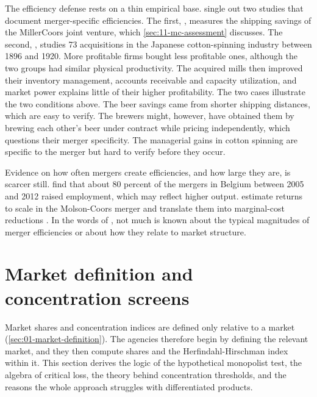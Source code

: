 The efficiency defense rests on a thin empirical base. \citet[pp.~219--221]{AskerNocke2021} single out two studies
that document merger-specific efficiencies. The first, \citet{AshenfelterHoskenWeinberg2015}, measures the
shipping savings of the MillerCoors joint venture, which \cref{sec:11-mc-assessment} discusses. The second,
\citet{BraguinskyEtAl2015}, studies 73 acquisitions in the Japanese cotton-spinning industry between 1896 and 1920.
More profitable firms bought less profitable ones, although the two groups had similar physical productivity. The
acquired mills then improved their inventory management, accounts receivable and capacity utilization, and market
power explains little of their higher profitability. The two cases illustrate the two conditions above. The beer
savings came from shorter shipping distances, which are easy to verify. The brewers might, however, have obtained
them by brewing each other's beer under contract while pricing independently, which questions their merger
specificity. The managerial gains in cotton spinning are specific to the merger but hard to verify before they
occur.

Evidence on how often mergers create efficiencies, and how large they are, is scarcer still.
\citet{GeurtsVanBiesebroeck2019} find that about 80 percent of the mergers in Belgium between 2005 and 2012 raised
employment, which may reflect higher output. \citet{GriecoPinkseSlade2018} estimate returns to scale in the
Molson-Coors merger and translate them into marginal-cost reductions \citep[pp.~221--222]{AskerNocke2021}. In the
words of \citet[p.~261]{AskerNocke2021}, not much is known about the typical magnitudes of merger efficiencies or
about how they relate to market structure.

\section{Market definition and concentration screens}\label{sec:11-marketdef}

Market shares and concentration indices are defined only relative to a market (\cref{sec:01-market-definition}).
The agencies therefore begin by defining the relevant market, and they then compute shares and the
Herfindahl-Hirschman index within it. This section derives the logic of the hypothetical monopolist test, the
algebra of critical loss, the theory behind concentration thresholds, and the reasons the whole approach struggles
with differentiated products.

